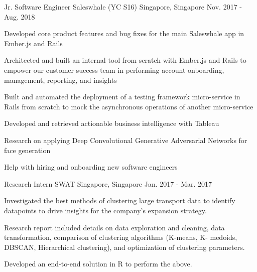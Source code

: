 

\begin{cventries}

  \cventry
    {Jr. Software Engineer} %
    {Saleswhale (YC S16)} %
    {Singapore, Singapore} %
    {Nov. 2017 - Aug. 2018} %
    {
      \begin{cvitems} %
      \item { Developed core product features and bug fixes for the main Saleswhale app in Ember.js and Rails}
      \item { Architected and built an internal tool from scratch with Ember.js and Rails to empower our customer success team in performing account onboarding, management, reporting, and insights}
      \item { Built and automated the deployment of a testing framework micro-service in Rails from scratch to mock the asynchronous operations of another micro-service}
      \item { Developed and retrieved actionable business intelligence with Tableau}
      \item { Research on applying Deep Convolutional Generative Adversarial Networks for face generation}
      \item { Help with hiring and onboarding new software engineers}
      \end{cvitems}
    }

  \cventry
    {Research Intern} %
    {SWAT} %
    {Singapore, Singapore} %
    {Jan. 2017 - Mar. 2017} %
    {
      \begin{cvitems} %
      \item { Investigated the best methods of clustering large transport data to identify datapoints to drive insights for the company’s expansion strategy.}
      \item { Research report included details on data exploration and cleaning, data transformation, comparison of clustering algorithms (K-means, K- medoids, DBSCAN, Hierarchical clustering), and optimization of clustering parameters.}
      \item { Developed an end-to-end solution in R to perform the above.}
      \end{cvitems}
    }


\end{cventries}
